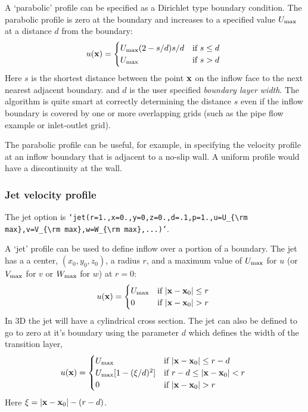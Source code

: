   A `parabolic' profile can be specified as a Dirichlet type
boundary condition. The parabolic profile is zero at the
boundary and increases to a specified value $U_{\rm max}$ at 
a distance $d$ from the boundary:
\[
     u(\mathbf{ x}) = \begin{cases}
               U_{\rm max} (2 -s/d ) s/d & \text{if $s\le d$ } \\
               U_{\rm max} &     \text{if $s> d$ }
              \end{cases}
\]
Here $s$ is the shortest distance between the point $\mathbf{ x}$ on the inflow face to the 
next nearest adjacent boundary.
and $d$ is the user specified {\it boundary layer width}.
The algorithm is quite smart at correctly determining the distance $s$ even if the 
inflow boundary is covered by one or more overlapping grids (such as the
pipe flow example or inlet-outlet grid).

The parabolic profile can be useful, for example,
in specifying the velocity profile at an inflow boundary that
is adjacent to a no-slip wall. A uniform profile would have a
discontinuity at the wall.

\subsubsection{Jet velocity profile} \label{sec:jet}

The jet option is {\tt `jet(r=1.,x=0.,y=0,z=0.,d=.1,p=1.,u=$U_{\rm max}$,v=$V_{\rm max}$,w=$W_{\rm max}$,...)'}.

A `jet' profile can be used to define inflow over
a portion of a boundary. The jet has a a center, $(x_0,y_0,z_0)$, a radius $r$, 
and a maximum value of $U_{\rm max}$ for $u$ (or $V_{\rm max}$ for $v$ or $W_{\rm max}$ for $w$) at $r=0$:
\[
     u(\mathbf{ x}) = \begin{cases}
               U_{\rm max} & \text{if $|\mathbf{ x}-\mathbf{ x}_0| \le r$  } \\
               0           & \text{if $|\mathbf{ x}-\mathbf{ x}_0| > r$ }
              \end{cases}
\]
In 3D the jet will have a cylindrical cross section.
The jet can also be defined to go to zero at it's boundary using the parameter
$d$ which defines the width of the transition layer,
\[
     u(\mathbf{ x}) = \begin{cases}
               U_{\rm max} & \text{if $|\mathbf{ x}-\mathbf{ x}_0| \le r-d $ } \\
               U_{\rm max}[1-(\xi/d)^2]   & \text{if $r-d \le |\mathbf{ x}-\mathbf{ x}_0| < r$ }\\
               0           & \text{if $|\mathbf{ x}-\mathbf{ x}_0| > r$ }
              \end{cases}
\]
Here $\xi = |\mathbf{ x}-\mathbf{ x}_0| - (r-d)$.

